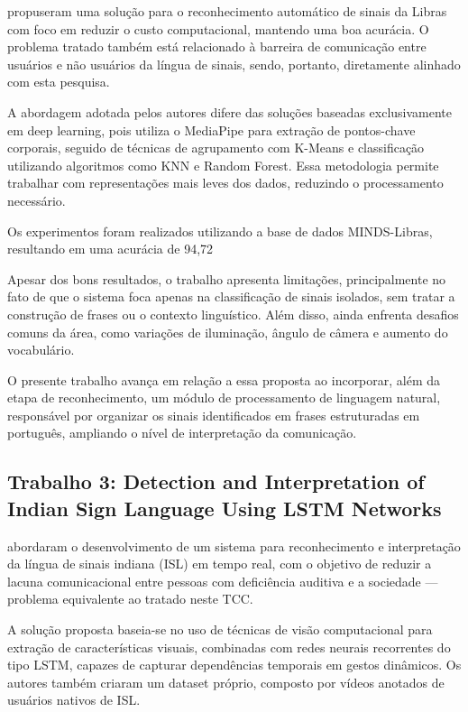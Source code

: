 \documentclass[
    12pt,                %
    openright,           %
    oneside,             %
    a4paper,             %
    english,             %
    brazil               %
]{abntex2}
\begin{document}
 propuseram uma solução para o reconhecimento automático de sinais da Libras com foco em reduzir o custo computacional, mantendo uma boa acurácia. O problema tratado também está relacionado à barreira de comunicação entre usuários e não usuários da língua de sinais, sendo, portanto, diretamente alinhado com esta pesquisa.

A abordagem adotada pelos autores difere das soluções baseadas exclusivamente em deep learning, pois utiliza o MediaPipe para extração de pontos-chave corporais, seguido de técnicas de agrupamento com K-Means e classificação utilizando algoritmos como KNN e Random Forest. Essa metodologia permite trabalhar com representações mais leves dos dados, reduzindo o processamento necessário.

Os experimentos foram realizados utilizando a base de dados MINDS-Libras, resultando em uma acurácia de 94,72%

Apesar dos bons resultados, o trabalho apresenta limitações, principalmente no fato de que o sistema foca apenas na classificação de sinais isolados, sem tratar a construção de frases ou o contexto linguístico. Além disso, ainda enfrenta desafios comuns da área, como variações de iluminação, ângulo de câmera e aumento do vocabulário.

O presente trabalho avança em relação a essa proposta ao incorporar, além da etapa de reconhecimento, um módulo de processamento de linguagem natural, responsável por organizar os sinais identificados em frases estruturadas em português, ampliando o nível de interpretação da comunicação.

\subsection{Trabalho 3: Detection and Interpretation of Indian Sign Language Using LSTM Networks}

 abordaram o desenvolvimento de um sistema para reconhecimento e interpretação da língua de sinais indiana (ISL) em tempo real, com o objetivo de reduzir a lacuna comunicacional entre pessoas com deficiência auditiva e a sociedade — problema equivalente ao tratado neste TCC.

A solução proposta baseia-se no uso de técnicas de visão computacional para extração de características visuais, combinadas com redes neurais recorrentes do tipo LSTM, capazes de capturar dependências temporais em gestos dinâmicos. Os autores também criaram um dataset próprio, composto por vídeos anotados de usuários nativos de ISL.
\end{document}
